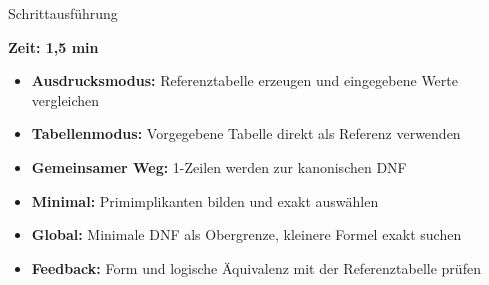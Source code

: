 \begin{contentsframe}{Schrittausführung}
{  \textbf{Zeit:  1,5 min}

  \begin{itemize}
    \item \textbf{Ausdrucksmodus:} Referenztabelle erzeugen und eingegebene Werte vergleichen
    \item \textbf{Tabellenmodus:} Vorgegebene Tabelle direkt als Referenz verwenden
    \item \textbf{Gemeinsamer Weg:} 1-Zeilen werden zur kanonischen DNF
    \item \textbf{Minimal:} Primimplikanten bilden und exakt auswählen
    \item \textbf{Global:} Minimale DNF als Obergrenze, kleinere Formel exakt suchen
    \item \textbf{Feedback:} Form und logische Äquivalenz mit der Referenztabelle prüfen
  \end{itemize}
}
\end{contentsframe}
